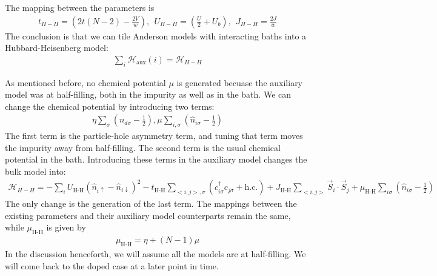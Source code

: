 \documentclass{report}
\numberwithin{equation}{section}
\begin{document}
The mapping between the parameters is
\begin{equation}\begin{aligned}
	\label{map_aux_bulk}
	t_{H-H} = \left(2t (N-2) - \frac{2V}{w}\right),~ ~ U_{H-H} = \left(\frac{U}{2} + U_b\right), ~ ~ J_{H-H} = \frac{2J}{w}
\end{aligned}\end{equation}
The conclusion is that we can tile Anderson models with interacting baths into a Hubbard-Heisenberg model:
\begin{equation}\begin{aligned}
	\label{siam_to_hubb}
	\sum_i \mathcal{H}_\text{aux}(i) = \mathcal{H}_{H-H}
\end{aligned}\end{equation}

As mentioned before, no chemical potential \(\mu\) is generated becuase the auxiliary model was at half-filling, both in the impurity as well as in the bath. We can change the chemical potential by introducing two terms:
\begin{equation}\begin{aligned}
	\eta \sum_\sigma\left(n_{d\sigma} - \frac{1}{2}\right), \mu \sum_{i,\sigma}\left(\hat n_{i\sigma} - \frac{1}{2}\right)
\end{aligned}\end{equation}
The first term is the particle-hole asymmetry term, and tuning that term moves the impurity away from half-filling. The second term is the usual chemical potential in the bath. Introducing these terms in the auxiliary model changes the bulk model into:
\begin{equation}\begin{aligned}
	\mathcal{H}_{H-H} = -\sum_{i} U_\text{H-H} \left(\hat n_{i \uparrow} - \hat n_{i \downarrow} \right)^2 - t_\text{H-H}\sum_{<i,j>,\sigma}\left(c^\dagger_{i\sigma}c_{j\sigma} + \text{h.c.}\right) + J_\text{H-H}\sum_{<i,j>} \vec{S}_i\cdot\vec{S}_j + \mu_\text{H-H}\sum_{i\sigma}\left(\hat n_{i\sigma} - \frac{1}{2}\right) 
\end{aligned}\end{equation}
The only change is the generation of the last term. The mappings between the existing parameters and their auxiliary model counterparts remain the same, while \(\mu_\text{H-H}\) is given by
\begin{equation}\begin{aligned}
	\mu_\text{H-H} = \eta + \left(N-1\right) \mu
\end{aligned}\end{equation}
In the discussion henceforth, we will assume all the models are at half-filling. We will come back to the doped case at a later point in time.
\end{document}
